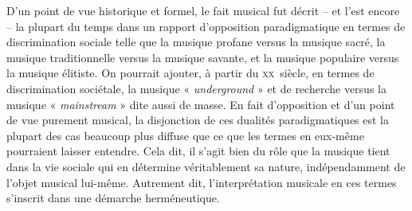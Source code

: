 D'un point de vue historique et formel, le fait musical fut décrit -- et l'est encore -- la plupart du temps dans un rapport  d'opposition paradigmatique en termes de discrimination sociale telle que la musique profane versus la musique sacré, la musique traditionnelle versus la musique savante, et la musique populaire versus la musique élitiste.
On pourrait ajouter, à partir du \textsc{xx}\ieme ~siècle, en termes de discrimination sociétale, la musique « \textit{underground} » et de recherche versus la musique « \textit{mainstream} » dite aussi de masse. 
En fait d’opposition et d’un point de vue purement musical, la disjonction
de ces dualités paradigmatiques est la plupart des cas beaucoup plus diffuse que ce que les
termes en eux-même pourraient laisser entendre. Cela dit, il s’agit bien du rôle
que la musique tient dans la vie sociale qui en détermine véritablement sa nature,
indépendamment de l’objet musical lui-même. Autrement dit, l’interprétation
musicale en ces termes s’inscrit dans une démarche herméneutique.
 
\bigskip

